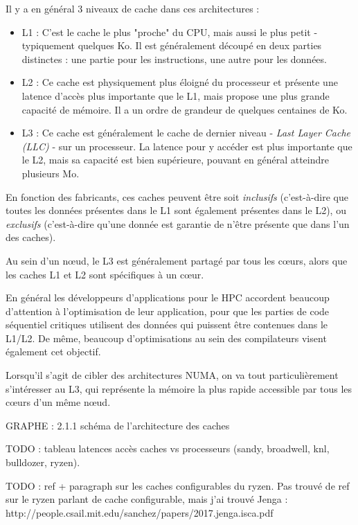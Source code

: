 Il y a en général 3 niveaux de cache dans ces architectures :
\begin{itemize}
  \item L1 : C'est le cache le plus "proche" du CPU, mais aussi le plus petit - typiquement quelques Ko. Il est généralement découpé en deux parties distinctes : une partie pour les instructions, une autre pour les données.
  \item L2 : Ce cache est physiquement plus éloigné du processeur et présente une latence d'accès plus importante que le L1, mais propose une plus grande capacité de mémoire. Il a un ordre de grandeur de quelques centaines de Ko.
  \item L3 : Ce cache est généralement le cache de dernier niveau - \emph{Last Layer Cache (LLC)} - sur un processeur. La latence pour y accéder est plus importante que le L2, mais sa capacité est bien supérieure, pouvant en général atteindre plusieurs Mo.
\end{itemize}

En fonction des fabricants, ces caches peuvent être soit \emph{inclusifs} (c'est-à-dire que toutes les données présentes dans le L1 sont également présentes dans le L2), ou \emph{exclusifs} (c'est-à-dire qu'une donnée est garantie de n'être présente que dans l'un des caches).

Au sein d'un nœud, le L3 est généralement partagé par tous les cœurs, alors que les caches L1 et L2 sont spécifiques à un cœur.

En général les développeurs d'applications pour le HPC accordent beaucoup d'attention à l'optimisation de leur application, pour que les parties de code séquentiel critiques utilisent des données qui puissent être contenues dans le L1/L2.
De même, beaucoup d'optimisations au sein des compilateurs visent également cet objectif.

Lorsqu'il s'agit de cibler des architectures NUMA, on va tout particulièrement s'intéresser au L3, qui représente la mémoire la plus rapide accessible par tous les cœurs d'un même nœud.

\begin{todo}
GRAPHE : 2.1.1 schéma de l'architecture des caches

TODO : tableau latences accès caches vs processeurs (sandy, broadwell, knl, bulldozer, ryzen).

TODO : ref + paragraph sur les caches configurables du ryzen.
Pas trouvé de ref sur le ryzen parlant de cache configurable, mais j'ai trouvé Jenga : http://people.csail.mit.edu/sanchez/papers/2017.jenga.isca.pdf
\end{todo}


